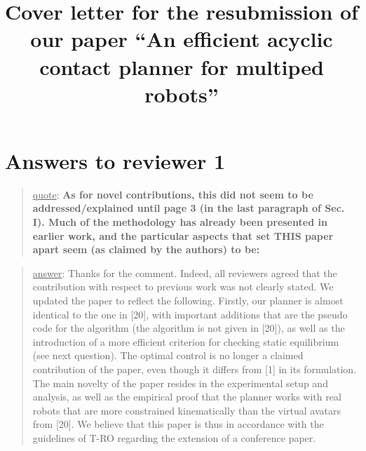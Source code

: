 \documentclass[a4paper]{article}
\author {}
\title {Cover letter for the resubmission of our paper ``An efficient acyclic contact planner for multiped robots''}
\date {}
\newcommand\quot[1]{\begin{quote} \underline{quote}: \textbf{#1}\end{quote}}
\newcommand\as[1]{\begin{quote} \underline{answer}: {#1}\end{quote} \leavevmode \\ }
\begin{document}
\maketitle


\section{Answers to reviewer 1}

\quot {As for novel contributions, this did not seem to be addressed/explained
until page 3 (in the last paragraph of Sec. I). Much of the methodology
has already been presented in earlier work, and the particular aspects
that set THIS paper apart seem (as claimed by the authors) to be: 
}

\as{Thanks for the comment. Indeed, all reviewers agreed that the contribution with respect to previous work was not clearly stated. We updated the paper to reflect the following. Firstly, our planner is almost identical to the one in [20], with important additions that are the pseudo code for the algorithm (the algorithm is not given in [20]), as well as the introduction of a more efficient criterion
for checking static equilibrium (see next question). The optimal control is no longer a claimed contribution of the paper, even though it differs from [1] in its formulation. The main
novelty of the paper resides in the experimental setup and analysis, as well as the empirical proof that the planner works with real robots that are more constrained kinematically than the virtual avatars from [20]. We believe that this paper is thus in accordance with the guidelines of T-RO regarding the extension of a conference paper.}
\end{document}
